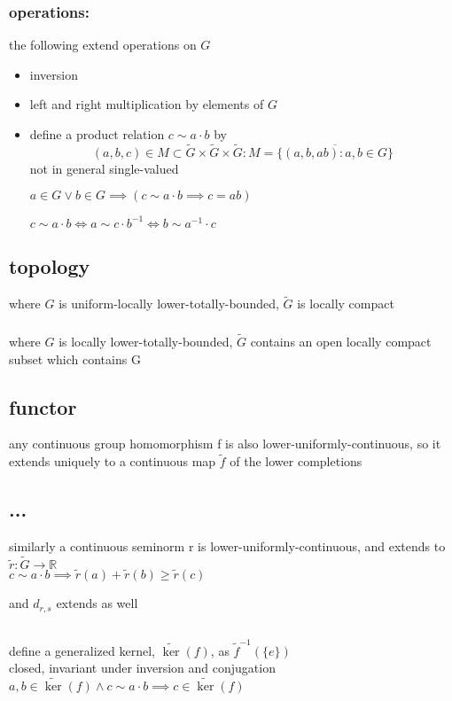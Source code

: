 \documentclass[a4paper]{article}
\newcommand{\R}{\mathbb{R}}
\newcommand{\complete}[1]{\widetilde{#1}}
\newcommand{\inv }{^{-1}}
\begin{document}
\subsubsection*{operations:} the following extend operations on $G$
\begin{itemize} 
\item inversion
\item left and right multiplication by elements of $G$
\item define a product relation $c\sim a\cdot b$ by \[(a,b,c)\in M \subset \complete{G} \times \complete{G}\times \complete{G}:M=\overline{\{(a,b,ab):a,b \in G\}}\]
not in general single-valued

$a\in G \lor b\in G \implies (c\sim a\cdot b \implies c=ab)$

$c\sim a\cdot b\iff a\sim c\cdot b\inv \iff b\sim a\inv \cdot c$
\end{itemize}
\subsection{topology} where $G$ is uniform-locally lower-totally-bounded, $\complete{G}$ is locally compact
\subsubsection*{} \label{loc.compact} where $G$ is locally lower-totally-bounded, $\complete{G}$ contains an open locally compact subset which contains G
\subsection{functor} any continuous group homomorphism f is also lower-uniformly-continuous, so it extends uniquely to a continuous map $\complete{f}$ of the lower completions
\subsection{...} similarly a continuous seminorm r is lower-uniformly-continuous, and extends to $\complete{r}:\complete{G}\to\R$\\
$c\sim a\cdot b\implies \complete{r}(a)+\complete{r}(b)\geq\complete{r}(c)$

and $d_{r,s}$ extends as well
\subsection{} define a generalized kernel, $\complete{\ker}(f)$, as $\complete{f}\inv (\{e\})$
\\closed, invariant under inversion and conjugation
\\$a,b\in\complete{\ker}(f)\land c\sim a\cdot b\implies c\in\complete{\ker}(f)$
\end{document}
